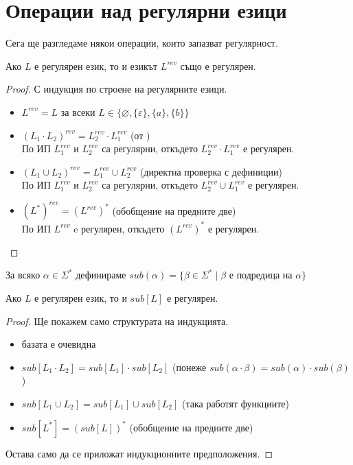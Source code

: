 \section{Операции над регулярни езици}

Сега ще разгледаме някои операции, които запазват регулярност.

\begin{claim}
    Ако $L$ е регулярен език, то и езикът $L^{rev}$ също е регулярен.
\end{claim}

\begin{proof}
    С индукция по строене на регулярните езици.

    \begin{itemize}
        \item $L^{rev} = L$ за всеки $L \in \{ \varnothing, \{ \varepsilon \}, \{ a \}, \{ b \} \}$ \checkmark
        \item $(L_1 \cdot L_2)^{rev} = L_2^{rev} \cdot L_1^{rev}$ (от ) \\
              По ИП $L_1^{rev}$ и $L_2^{rev}$ са регулярни, откъдето $L_2^{rev} \cdot L_1^{rev}$ е регулярен.
        \item $(L_1 \cup L_2)^{rev} = L_1^{rev} \cup L_2^{rev}$ (директна проверка с дефиниции) \\
              По ИП $L_1^{rev}$ и $L_2^{rev}$ са регулярни, откъдето $L_2^{rev} \cup L_1^{rev}$ е регулярен.
        \item $(L^*)^{rev} = (L^{rev})^*$ (обобщение на предните две) \\
              По ИП $L^{rev}$ e регулярен, откъдето $(L^{rev})^*$ е регулярен.
    \end{itemize}
\end{proof}

\begin{definition}
    За всяко $\alpha \in \Sigma^*$ дефинираме $sub(\alpha) = \{ \beta \in \Sigma^* \mid \beta \text{ е подредица на } \alpha \}$
\end{definition}

\begin{claim}
    Ако $L$ е регулярен език, то и $sub[L]$ е регулярен.
\end{claim}

\begin{proof}
    Ще покажем само структурата на индукцията.

    \begin{itemize}
        \item базата е очевидна \checkmark
        \item $sub[L_1 \cdot L_2] = sub[L_1] \cdot sub[L_2]$ (понеже $sub(\alpha \cdot \beta) = sub(\alpha) \cdot sub(\beta)$)
        \item $sub[L_1 \cup L_2] = sub[L_1] \cup sub[L_2]$ (така работят функциите)
        \item $sub[L^*] = (sub[L])^*$ (обобщение на предните две)
    \end{itemize}

    Остава само да се приложат индукционните предположения.
\end{proof}